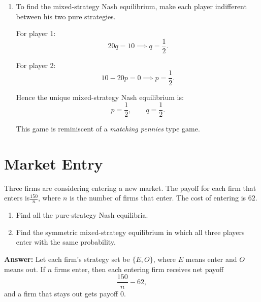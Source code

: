 \documentclass[12pt,a4paper]{article}
\begin{document}
\begin{enumerate}[label=\alph*.]
\begin{center}
  \end{center}
  \item To find the mixed-strategy Nash equilibrium, make each player indifferent between his two pure strategies.

  For player 1:
  \[
    20q=10
    \implies
    q=\frac12.
  \]

  For player 2:
  \[
    10-20p=0
    \implies
    p=\frac12.
  \]

  Hence the unique mixed-strategy Nash equilibrium is:
  \[
    p=\frac12,\qquad q=\frac12.
  \]

  This game is reminiscent of a \emph{matching pennies} type game.
\end{enumerate}

\section{Market Entry}
Three firms are considering entering a new market. The payoff for each firm that enters is\(\frac{150}{n}\), where \(n\) is the number of firms that enter. The cost of entering is \(62\).

\begin{enumerate}[label=\alph*.]
  \item Find all the pure-strategy Nash equilibria.
  \item Find the symmetric mixed-strategy equilibrium in which all three players enter with the same probability.
\end{enumerate}

\vspace{0.5cm}

\noindent\textbf{Answer: }Let each firm's strategy set be \(\{E,O\}\), where \(E\) means enter and \(O\) means out. If \(n\) firms enter, then each entering firm receives net payoff
\[
\frac{150}{n}-62,
\]
and a firm that stays out gets payoff \(0\).
\end{document}
